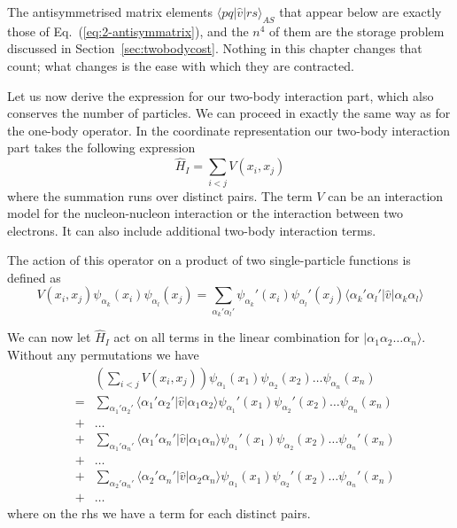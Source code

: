 The antisymmetrised matrix elements $\langle pq|\hat{v}|rs\rangle_{AS}$ that
appear below are exactly those of Eq.~(\ref{eq:2-antisymmatrix}), and the
$n^4$ of them are the storage problem discussed in
Section~\ref{sec:twobodycost}.  Nothing in this chapter changes that count;
what changes is the ease with which they are contracted.


Let us now derive the expression for our two-body interaction part, which also conserves the number of particles.
We can proceed in exactly the same way as for the one-body operator. In the coordinate representation our
two-body interaction part takes the following expression
\begin{equation}
	\hat{H}_I = \sum_{i < j} V(x_i,x_j) \label{eq:2-31}
\end{equation}
where the summation runs over distinct pairs. The term $V$ can be an interaction model for the nucleon-nucleon interaction
or the interaction between two electrons. It can also include additional two-body interaction terms. 

The action of this operator on a product of 
two single-particle functions is defined as 
\begin{equation}
	V(x_i,x_j) \psi_{\alpha_k}(x_i) \psi_{\alpha_l}(x_j) = \sum_{\alpha_k'\alpha_l'} 
		\psi_{\alpha_k}'(x_i)\psi_{\alpha_l}'(x_j) 
		\langle \alpha_k'\alpha_l'|\hat{v}|\alpha_k\alpha_l\rangle \label{eq:2-32}
\end{equation}

We can now let $\hat{H}_I$ act on all terms in the linear combination for $|\alpha_1\alpha_2\dots\alpha_n\rangle$. Without any permutations we have
\begin{align}
	&& \left( \sum_{i < j} V(x_i,x_j) \right) \psi_{\alpha_1}(x_1)\psi_{\alpha_2}(x_2)\dots \psi_{\alpha_n}(x_n) \nonumber \\
	&=& \sum_{\alpha_1'\alpha_2'} \langle \alpha_1'\alpha_2'|\hat{v}|\alpha_1\alpha_2\rangle
		\psi_{\alpha_1}'(x_1)\psi_{\alpha_2}'(x_2)\dots \psi_{\alpha_n}(x_n) \nonumber \\
	& +& \dots \nonumber \\
	&+& \sum_{\alpha_1'\alpha_n'} \langle \alpha_1'\alpha_n'|\hat{v}|\alpha_1\alpha_n\rangle
		\psi_{\alpha_1}'(x_1)\psi_{\alpha_2}(x_2)\dots \psi_{\alpha_n}'(x_n) \nonumber \\
	& +& \dots \nonumber \\
	&+& \sum_{\alpha_2'\alpha_n'} \langle \alpha_2'\alpha_n'|\hat{v}|\alpha_2\alpha_n\rangle
		\psi_{\alpha_1}(x_1)\psi_{\alpha_2}'(x_2)\dots \psi_{\alpha_n}'(x_n) \nonumber \\
	 & +& \dots \label{eq:2-33}
\end{align}
where on the rhs we have a term for each distinct pairs. 


